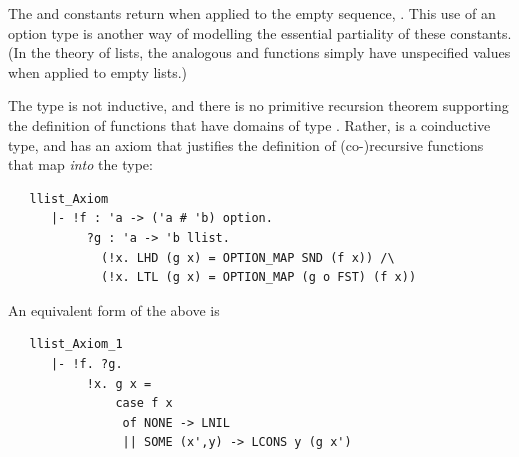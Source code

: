 {The  and  constants return  when applied to
the empty sequence, .  This use of an option type is another
way of modelling the essential partiality of these constants.  (In the
theory of lists, the analogous  and  functions simply
have unspecified values when applied to empty lists.)

The type  is not inductive, and there is no primitive
recursion theorem supporting the definition of functions that have
domains of type .  Rather,  is a coinductive type,
and has an axiom that justifies the definition of (co-)recursive
functions that map \emph{into} the  type:
\begin{hol}
\begin{verbatim}
   llist_Axiom
      |- !f : 'a -> ('a # 'b) option.
           ?g : 'a -> 'b llist.
             (!x. LHD (g x) = OPTION_MAP SND (f x)) /\
             (!x. LTL (g x) = OPTION_MAP (g o FST) (f x))
\end{verbatim}
\end{hol}
\noindent An equivalent form of the above is
\begin{hol}
\begin{verbatim}
   llist_Axiom_1
      |- !f. ?g.
           !x. g x =
               case f x
                of NONE -> LNIL
                || SOME (x',y) -> LCONS y (g x')
\end{verbatim}
\end{hol}

}

